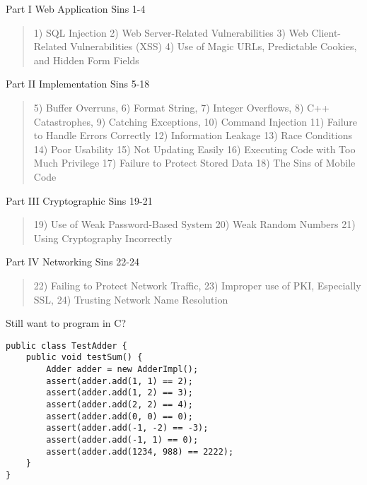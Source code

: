 \documentclass[Screen16to9,17pt]{foils}
\begin{document}
\begin{list1}
\item Part I Web Application Sins 1-4
\begin{quote}
1) SQL Injection
2) Web Server-Related Vulnerabilities
3) Web Client-Related Vulnerabilities (XSS)
4) Use of Magic URLs, Predictable Cookies, and Hidden Form Fields
\end{quote}
\item Part II Implementation Sins 5-18
\begin{quote}
5) Buffer Overruns, 6) Format String, 7) Integer Overflows,
8) C++ Catastrophes, 9) Catching Exceptions, 10) Command Injection
11) Failure to Handle Errors Correctly 12) Information Leakage
13) Race Conditions 14) Poor Usability
15) Not Updating Easily
16) Executing Code with Too Much Privilege
17) Failure to Protect Stored Data
18) The Sins of Mobile Code
\end{quote}
\end{list1}




\begin{list1}
\item Part III Cryptographic Sins 19-21
\begin{quote}
19) Use of Weak Password-Based System
20) Weak Random Numbers
21) Using Cryptography Incorrectly
\end{quote}
\item Part IV Networking Sins 22-24
\begin{quote}
22) Failing to Protect Network Traffic,
23) Improper use of PKI, Especially SSL,
24) Trusting Network Name Resolution
\end{quote}
\end{list1}

\vskip 2cm
\centerline{\Large Still want to program in C?}






\begin{verbatim}
public class TestAdder {
    public void testSum() {
        Adder adder = new AdderImpl();
        assert(adder.add(1, 1) == 2);
        assert(adder.add(1, 2) == 3);
        assert(adder.add(2, 2) == 4);
        assert(adder.add(0, 0) == 0);
        assert(adder.add(-1, -2) == -3);
        assert(adder.add(-1, 1) == 0);
        assert(adder.add(1234, 988) == 2222);
    }
}
\end{verbatim}
\end{document}
